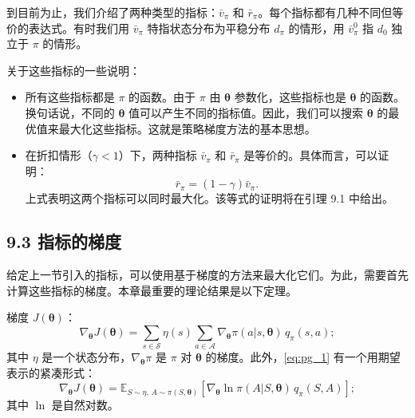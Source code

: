 \documentclass[UTF8]{article}
\begin{document}
\begin{remarkbox}
到目前为止，我们介绍了两种类型的指标：$\bar{v}_\pi$ 和 $\bar{r}_\pi$。每个指标都有几种不同但等价的表达式。有时我们用 $\bar{v}_\pi$ 特指状态分布为平稳分布 $d_\pi$ 的情形，用 $\bar{v}_\pi^0$ 指 $d_0$ 独立于 $\pi$ 的情形。

关于这些指标的一些说明：
\begin{itemize}
    \item 所有这些指标都是 $\pi$ 的函数。由于 $\pi$ 由 $\boldsymbol{\theta}$ 参数化，这些指标也是 $\boldsymbol{\theta}$ 的函数。换句话说，不同的 $\boldsymbol{\theta}$ 值可以产生不同的指标值。因此，我们可以搜索 $\boldsymbol{\theta}$ 的最优值来最大化这些指标。这就是策略梯度方法的基本思想。
    \item 在折扣情形（$\gamma < 1$）下，两种指标 $\bar{v}_\pi$ 和 $\bar{r}_\pi$ 是等价的。具体而言，可以证明：
    \[
    \bar{r}_\pi = (1 - \gamma) \bar{v}_\pi.
    \]
    上式表明这两个指标可以同时最大化。该等式的证明将在引理 9.1 中给出。
\end{itemize}
\end{remarkbox}

\subsection*{9.3 指标的梯度}

给定上一节引入的指标，可以使用基于梯度的方法来最大化它们。为此，需要首先计算这些指标的梯度。本章最重要的理论结果是以下定理。

\begin{theorembox}[9.1 策略梯度定理]
    梯度 $J(\boldsymbol{\theta})$：
    \begin{equation}
    \nabla_{\boldsymbol{\theta}} J(\boldsymbol{\theta}) = \sum_{s \in \mathcal{S}} \eta(s) \sum_{a \in \mathcal{A}} \nabla_{\boldsymbol{\theta}} \pi(a|s, \boldsymbol{\theta}) \, q_\pi(s, a); \label{eq:pg_1}
    \end{equation}
    其中 $\eta$ 是一个状态分布，$\nabla_{\boldsymbol{\theta}} \pi$ 是 $\pi$ 对 $\boldsymbol{\theta}$ 的梯度。此外，\eqref{eq:pg_1} 有一个用期望表示的紧凑形式：
    \begin{equation}
    \nabla_{\boldsymbol{\theta}} J(\boldsymbol{\theta}) = \mathbb{E}_{S \sim \eta, \, A \sim \pi(S,\boldsymbol{\theta})} \left[ \nabla_{\boldsymbol{\theta}} \ln \pi(A|S, \boldsymbol{\theta}) \, q_\pi(S, A) \right]; \label{eq:pg_2}
    \end{equation}
    其中 $\ln$ 是自然对数。
\end{theorembox}
\end{document}
